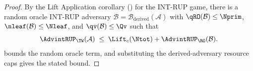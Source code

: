 \begin{proof}
By the Lift Application corollary () for the
\textsf{INT-RUP} game, there is a random oracle \textsf{INT-RUP} adversary
$\mathcal{B} = \mathcal{B}_{\mathrm{derived}}(\mathcal{A})$ with
$\qRO(\mathcal{B}) \leq \Nprim$, $\nleaf(\mathcal{B}) \leq \Nleaf$, and
$\qv(\mathcal{B}) \leq \Qv$ such that
\[
  \AdvintRUP_\TW(\mathcal{A})
  \;\leq\;
  \Lift_c(\Ntot) + \AdvintRUP_{\RO}(\mathcal{B}).
\]
 bounds the random oracle term, and substituting the
derived-adversary resource caps gives the stated bound.
\end{proof}
